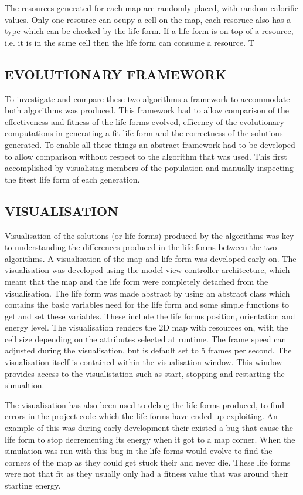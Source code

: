 \documentclass[10pt,twocolumn]{article}
\begin{document}
The resources generated for each map are randomly placed, with random calorific values. Only one resource can ocupy a cell on the map, each resoruce also has
a type which can be checked by the life form. If a life form is on top of a resource, i.e. it is in the same cell then the life form can consume a resource. 
T 

\subsection{EVOLUTIONARY FRAMEWORK}
To investigate and compare these two algorithms %
a framework to accommodate both algorithms was produced. This framework had to allow comparison of the effectiveness and fitness of the life forms evolved, efficency of the 
evolutionary computations in generating a fit life form and the correctness of the solutions generated. To enable all these things an abstract framework had 
to be developed to allow comparison without respect to the algorithm that was used. This first accomplished by visualising members of the population and 
manually inspecting the fitest life form of each generation. 


\subsection{VISUALISATION}
Visualisation of the solutions (or life forms) produced by the algorithms was key
to understanding the differences produced in the life forms between the two algorithms. A visualisation of the map and life form
was developed early on. The visualisation was developed using the model view controller architecture,
which meant that the map and the life form were completely detached from the visualisation.
The life form was made abstract by using an abstract class which contains the basic variables need for the life
form and some simple functions to get and set these variables. These include the life forms position, orientation
and energy level. The visualisation renders the 2D map with resources on, with the cell size depending on the attributes selected at runtime. The frame speed can
adjusted during the visualisation, but is default set to 5 frames per second. The visualisation itself is contained within the visualisation window. This window
provides access to the visualistation such as start, stopping and restarting the simualtion.


The visualisation has also been used to debug the life forms produced, to find errors in the project code which the life forms have ended up exploiting. An example
of this was during early development their existed a bug that cause the life form to stop decrementing its energy when it got to a map corner. When the simulation
was run with this bug in the life forms would evolve to find the corners of the map as they could get stuck their and never die. These life forms were not that fit 
as they usually only had a fitness value that was around their starting energy.
\end{document}
